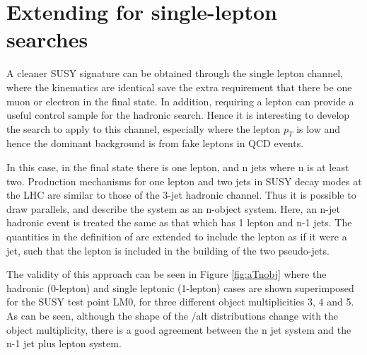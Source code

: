 \section{Extending \alt for single-lepton searches}

A cleaner SUSY signature can be obtained through the single lepton channel, where the kinematics are identical save the extra requirement that there be one muon or electron in the final state. In addition, requiring a lepton can provide a useful control sample for the hadronic search. Hence it is interesting to develop the \alt search to apply to this channel, especially where the lepton $p_{T}$ is low and hence the dominant background is from fake leptons in QCD events. 

In this case, in the final state there is one lepton, and n jets where n is at least two. Production mechanisms for one lepton and two jets in SUSY decay modes at the LHC are similar to those of the 3-jet hadronic channel. Thus it is possible to draw parallels, and describe the system as an n-object system. Here, an n-jet hadronic event is treated the same as that which has 1 lepton and n-1 jets.  The quantities in the definition of \alt are extended to include the lepton as if it were a jet, such that the lepton is included in the building of the two pseudo-jets. 

The validity of this approach can be seen in Figure \ref{fig:aTnobj} where the hadronic (0-lepton) and single leptonic (1-lepton) cases are shown superimposed for the SUSY test point LM0, for three different object multiplicities 3, 4 and 5. As can be seen, although the shape of the /alt distributions change with the object multiplicity, there is a good agreement between the n jet system and the n-1 jet plus lepton system. 

